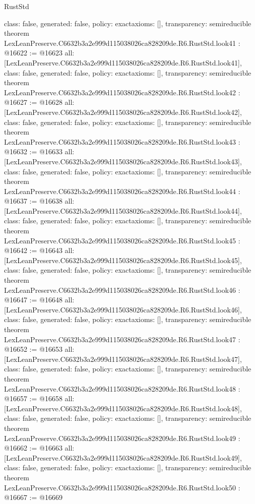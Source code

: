 \begin{lexlean}{RustStd}
\begin{coremodule}
{  class: false,
  generated: false,
  policy: exact{axioms: []},
  transparency: semireducible
}
theorem LexLeanPreserve.C6632b3a2e999d115038026ca828209de.R6.RustStd.look41 : @16622 := @16623 {
  all: [LexLeanPreserve.C6632b3a2e999d115038026ca828209de.R6.RustStd.look41],
  class: false,
  generated: false,
  policy: exact{axioms: []},
  transparency: semireducible
}
theorem LexLeanPreserve.C6632b3a2e999d115038026ca828209de.R6.RustStd.look42 : @16627 := @16628 {
  all: [LexLeanPreserve.C6632b3a2e999d115038026ca828209de.R6.RustStd.look42],
  class: false,
  generated: false,
  policy: exact{axioms: []},
  transparency: semireducible
}
theorem LexLeanPreserve.C6632b3a2e999d115038026ca828209de.R6.RustStd.look43 : @16632 := @16633 {
  all: [LexLeanPreserve.C6632b3a2e999d115038026ca828209de.R6.RustStd.look43],
  class: false,
  generated: false,
  policy: exact{axioms: []},
  transparency: semireducible
}
theorem LexLeanPreserve.C6632b3a2e999d115038026ca828209de.R6.RustStd.look44 : @16637 := @16638 {
  all: [LexLeanPreserve.C6632b3a2e999d115038026ca828209de.R6.RustStd.look44],
  class: false,
  generated: false,
  policy: exact{axioms: []},
  transparency: semireducible
}
theorem LexLeanPreserve.C6632b3a2e999d115038026ca828209de.R6.RustStd.look45 : @16642 := @16643 {
  all: [LexLeanPreserve.C6632b3a2e999d115038026ca828209de.R6.RustStd.look45],
  class: false,
  generated: false,
  policy: exact{axioms: []},
  transparency: semireducible
}
theorem LexLeanPreserve.C6632b3a2e999d115038026ca828209de.R6.RustStd.look46 : @16647 := @16648 {
  all: [LexLeanPreserve.C6632b3a2e999d115038026ca828209de.R6.RustStd.look46],
  class: false,
  generated: false,
  policy: exact{axioms: []},
  transparency: semireducible
}
theorem LexLeanPreserve.C6632b3a2e999d115038026ca828209de.R6.RustStd.look47 : @16652 := @16653 {
  all: [LexLeanPreserve.C6632b3a2e999d115038026ca828209de.R6.RustStd.look47],
  class: false,
  generated: false,
  policy: exact{axioms: []},
  transparency: semireducible
}
theorem LexLeanPreserve.C6632b3a2e999d115038026ca828209de.R6.RustStd.look48 : @16657 := @16658 {
  all: [LexLeanPreserve.C6632b3a2e999d115038026ca828209de.R6.RustStd.look48],
  class: false,
  generated: false,
  policy: exact{axioms: []},
  transparency: semireducible
}
theorem LexLeanPreserve.C6632b3a2e999d115038026ca828209de.R6.RustStd.look49 : @16662 := @16663 {
  all: [LexLeanPreserve.C6632b3a2e999d115038026ca828209de.R6.RustStd.look49],
  class: false,
  generated: false,
  policy: exact{axioms: []},
  transparency: semireducible
}
theorem LexLeanPreserve.C6632b3a2e999d115038026ca828209de.R6.RustStd.look50 : @16667 := @16669 {
}
\end{coremodule}
\end{lexlean}
